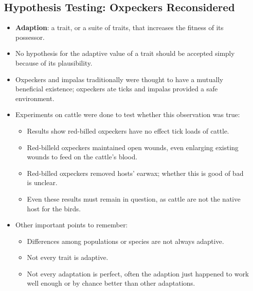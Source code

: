 \documentclass[12pt,a4paper]{article}
\begin{document}
\subsection{Hypothesis Testing: Oxpeckers Reconsidered}
\begin{itemize}
    \item \textbf{Adaption}: a trait, or a suite of traits, that increases the fitness of its possessor.
    \item No hypothesis for the adaptive value of a trait should be accepted simply because of its plausibility.
    \item Oxpeckers and impalas traditionally were thought to have a mutually beneficial existence; oxpeckers ate ticks and impalas provided a safe environment.
    \item Experiments on cattle were done to test whether this observation was true:
        \begin{itemize}
            \item Results show red-billed oxpeckers have no effect tick loads of cattle.
            \item Red-billeld oxpeckers maintained open wounds, even enlarging existing wounds to feed on the cattle's blood.
            \item Red-billed oxpeckers removed hosts' earwax; whether this is good of bad is unclear.
            \item Even these results must remain in question, as cattle are not the native host for the birds.
        \end{itemize}
    \item Other important points to remember: 
        \begin{itemize}
            \item Differences among populations or species are not always adaptive.
            \item Not every trait is adaptive.
            \item Not every adaptation is perfect, often the adaption just happened to work well enough or by chance better than other adaptations.
        \end{itemize} 
\end{itemize}
\end{document}
